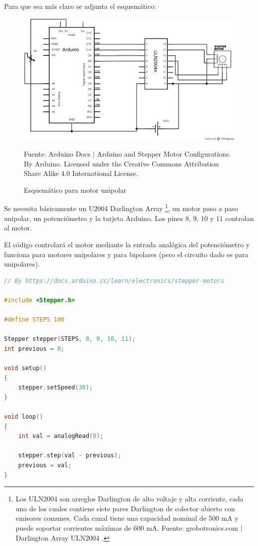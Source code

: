 \documentclass[conference]{IEEEtran}
\begin{document}
Para que sea más claro se adjunta el esquemático:

\begin{figure}[H]
\centering
\includegraphics[width=0.3\paperwidth]{images/unipolar-knob-schematic}
\caption{Esquemático para motor unipolar}
\footnotesize
Fuente: Arduino Docs $\mid$ Arduino and Stepper Motor Configurations. By Arduino. Licensed under the Creative Commons Attribution Share Alike 4.0
International License.
\end{figure}

Se necesita básicamente un U2004 Darlington Array \footnote{Los ULN2004 son arreglos Darlington de alto voltaje y alta corriente, cada uno de los cuales contiene siete pares Darlington de colector abierto con emisores comunes. Cada canal tiene una capacidad nominal de 500 mA y puede soportar corrientes máximas de 600 mA. Fuente: grobotronics.com $\mid$ Darlington Array ULN2004 \cite{grobotronicscom-2022}.}, un motor paso a paso unipolar, un potenciómetro y la tarjeta Arduino. Los pines $8$, $9$, $10$ y $11$ controlan al motor.

\bigbreak

El código controlará el motor mediante la entrada analógica del potenciómetro y funciona para motores unipolares y para bipolares (pero el circuito dado es para unipolares).

\begin{lstlisting}[language=C, caption=Programa para controlar motor paso a paso unipolar/bipolar mediante potenciómetro. Fuente: Arduino Docs $\mid$ https://docs.arduino.cc/learn/electronics/stepper-motors \cite{arduino-docs-stepper-motor-2022}]
// By https://docs.arduino.cc/learn/electronics/stepper-motors

#include <Stepper.h>

#define STEPS 100

Stepper stepper(STEPS, 8, 9, 10, 11);
int previous = 0;

void setup()
{
    stepper.setSpeed(30);
}

void loop()
{
    int val = analogRead(0);

    stepper.step(val - previous);
    previous = val;
}
\end{lstlisting}
\end{document}
